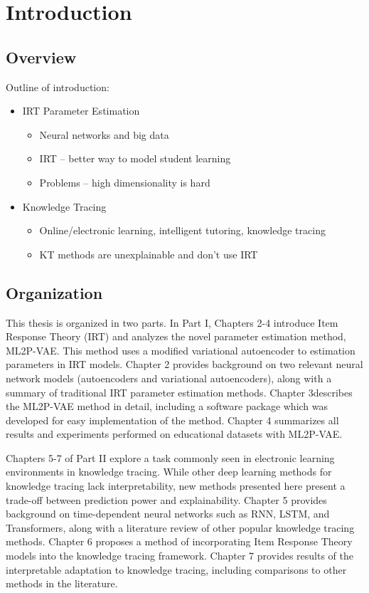 \chapter{Introduction}
\section{Overview}

Outline of introduction:
\begin{itemize}
  \item IRT Parameter Estimation
\begin{itemize}
  \item Neural networks and big data
  \item IRT -- better way to model student learning
  \item Problems -- high dimensionality is hard
\end{itemize}
  \item Knowledge Tracing
\begin{itemize}
  \item Online/electronic learning, intelligent tutoring, knowledge tracing
  \item KT methods are unexplainable and don't use IRT
\end{itemize}
\end{itemize}

\section{Organization}
This thesis is organized in two parts. In Part I, Chapters 2-4 introduce Item Response Theory (IRT) and analyzes the novel parameter estimation method, ML2P-VAE. This method uses a modified variational autoencoder to estimation parameters in IRT models. Chapter 2 provides background on two relevant neural network models (autoencoders and variational autoencoders), along with a summary of traditional IRT parameter estimation methods. Chapter 3describes the ML2P-VAE method in detail, including a software package which was developed for easy implementation of the method. Chapter 4 summarizes all results and experiments performed on educational datasets with ML2P-VAE.

Chapters 5-7 of Part II explore a task commonly seen in electronic learning environments in knowledge tracing. While other deep learning methods for knowledge tracing lack interpretability, new methods presented here present a trade-off between prediction power and explainability. Chapter 5 provides background on time-dependent neural networks such as RNN, LSTM, and Transformers, along with a literature review of other popular knowledge tracing methods. Chapter 6 proposes a method of incorporating Item Response Theory models into the knowledge tracing framework. Chapter 7 provides results of the interpretable adaptation to knowledge tracing, including comparisons to other methods in the literature.

